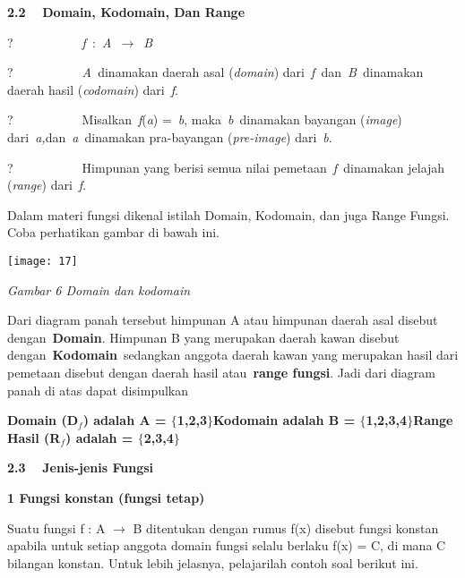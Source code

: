 \documentclass[11pt,fleqn]{book} %
\begin{document}
\noindent \textbf{2.2 }~~\textbf{Domain, Kodomain, Dan Range}

\noindent \textbf{}

\noindent ?~~~~~~~~~~~\textit{f~}:~\textit{A~}$\mathrm{\to}$~\textit{B}

\noindent ?~~~~~~~~~~~\textit{A~}dinamakan daerah asal (\textit{domain}) dari~\textit{f~}dan~\textit{B~}dinamakan daerah hasil (\textit{codomain}) dari~\textit{f}.

\noindent ?~~~~~~~~~~~Misalkan~\textit{f}(\textit{a}) =~\textit{b}, maka~\textit{b~}dinamakan bayangan (\textit{image}) dari~\textit{a,}dan~\textit{a~}dinamakan pra-bayangan (\textit{pre-image}) dari~\textit{b}.

\noindent ?~~~~~~~~~~~Himpunan yang berisi semua nilai pemetaan~\textit{f~}dinamakan jelajah (\textit{range}) dari~\textit{f}.

\noindent 

\noindent Dalam materi fungsi dikenal istilah Domain, Kodomain, dan juga Range Fungsi. Coba perhatikan gambar di bawah ini.

\begin{center}
\noindent \texttt{[image: 17]}
\end{center}

\noindent \textit{Gambar 6 Domain dan kodomain}

\noindent 

\noindent Dari diagram panah tersebut himpunan A atau himpunan daerah asal disebut dengan~\textbf{Domain}. Himpunan B yang merupakan daerah kawan disebut dengan~\textbf{Kodomain}~sedangkan anggota daerah kawan yang merupakan hasil dari pemetaan disebut dengan daerah hasil atau~\textbf{range fungsi}. Jadi dari diagram panah di atas dapat disimpulkan

\noindent 

\noindent \textbf{Domain (D${}_{f}$) adalah A = $\boldsymbol{\{}$1,2,3$\boldsymbol{\}}$Kodomain adalah B = $\boldsymbol{\{}$1,2,3,4$\boldsymbol{\}}$Range Hasil (R${}_{f}$) adalah = $\boldsymbol{\{}$2,3,4$\boldsymbol{\}}$}

\noindent 

\noindent \textbf{2.3 }~~\textbf{Jenis-jenis Fungsi}

\textbf{}

\textbf{1  Fungsi konstan (fungsi tetap)}

\textbf{}

Suatu fungsi f : A $\mathrm{\to}$ B ditentukan dengan rumus f(x) disebut fungsi konstan apabila untuk setiap anggota domain fungsi selalu berlaku f(x) = C, di mana C bilangan konstan. Untuk lebih jelasnya, pelajarilah contoh soal berikut ini.
\end{document}
